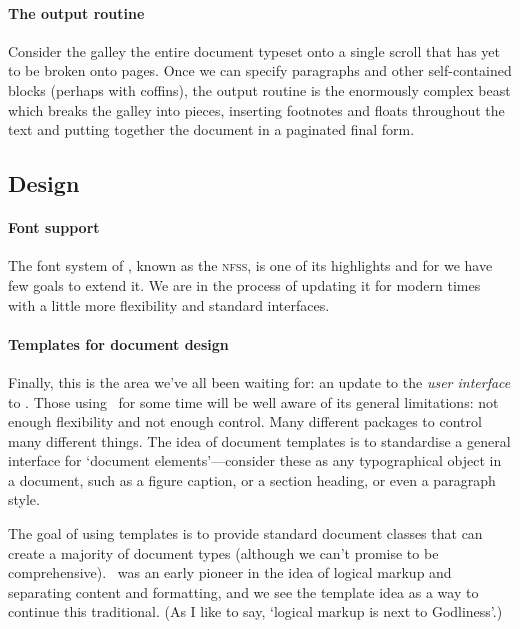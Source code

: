 \documentclass{ltnews}
\providecommand\acro[1]{\textsc{\MakeLowercase{#1}}}
\begin{document}
\paragraph{The output routine}

Consider the galley the entire document typeset onto a single scroll that has yet to be broken onto pages.
Once we can specify paragraphs and other self-contained blocks (perhaps with coffins), the output routine is the enormously complex beast which breaks the galley into pieces, inserting footnotes and floats throughout the text and putting together the document in a paginated final form.

\subsection{Design}

\paragraph{Font support}

The font system of \TeaTeXe, known as the \acro{NFSS}, is one of its highlights and for \TeaTeX we have few goals to extend it.
We are in the process of updating it for modern times with a little more flexibility and standard interfaces.

\paragraph{Templates for document design}

Finally, this is the area we've all been waiting for: an update to the \emph{user interface} to \TeaTeX.
Those using \LaTeXe\ for some time will be well aware of its general limitations: not enough flexibility and not enough control.
Many different packages to control many different things.
The idea of document templates is to standardise a general interface for `document elements'---consider these as any typographical object in a document, such as a figure caption, or a section heading, or even a paragraph style.

The goal of using templates is to provide standard document classes that can create a majority of document types (although we can't promise to be comprehensive).
\TeaTeX\ was an early pioneer in the idea of logical markup and separating content and formatting, and we see the template idea as a way to continue this traditional.
(As I like to say, `logical markup is next to Godliness'.)
\end{document}
